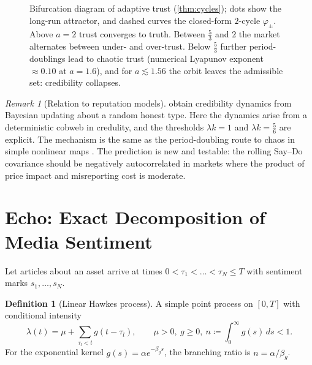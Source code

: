 \documentclass[11pt,a4paper]{article}
\theoremstyle{plain}
\theoremstyle{definition}
\newtheorem{definition}[theorem]{Definition}
\theoremstyle{remark}
\newtheorem{remark}[theorem]{Remark}
\begin{document}
\begin{figure}[ht]
\caption{Bifurcation diagram of adaptive trust (\cref{thm:cycles}); dots show the long-run attractor, and dashed curves the closed-form $2$-cycle $\varphi_\pm$. Above $a=2$ trust converges to truth. Between $\tfrac53$ and $2$ the market alternates between under- and over-trust. Below $\tfrac53$ further period-doublings lead to chaotic trust (numerical Lyapunov exponent $\approx0.10$ at $a=1.6$), and for $a\lesssim1.56$ the orbit leaves the admissible set: credibility collapses.}
\label{fig:bifurcation}
\end{figure}

\begin{remark}[Relation to reputation models]
\citet{benabou1992} obtain credibility dynamics from Bayesian updating about a random honest type. Here the dynamics arise from a deterministic cobweb in credulity, and the thresholds $\lambda k=1$ and $\lambda k=\tfrac56$ are explicit. The mechanism is the same as the period-doubling route to chaos in simple nonlinear maps \citep{may1976}. The prediction is new and testable: the rolling Say--Do covariance should be negatively autocorrelated in markets where the product of price impact and misreporting cost is moderate.
\end{remark}

\section{Echo: Exact Decomposition of Media Sentiment}\label{sec:echo}

Let articles about an asset arrive at times $0<\tau_1<\dots<\tau_N\le T$ with sentiment marks $s_1,\dots,s_N$.

\begin{definition}[Linear Hawkes process]
A simple point process on $[0,T]$ with conditional intensity
\[
  \lambda(t)=\mu+\sum_{\tau_l<t}g(t-\tau_l),\qquad \mu>0,\ g\ge0,\ n\coloneqq\int_0^\infty g(s)\,ds<1 .
\]
For the exponential kernel $g(s)=\alpha e^{-\beta_g s}$, the branching ratio is $n=\alpha/\beta_g$.
\end{definition}
\end{document}
